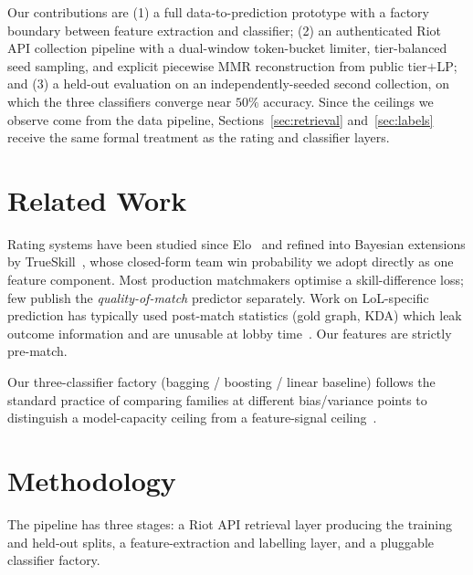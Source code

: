 \documentclass{article}
\begin{document}
Our contributions are (1) a full data-to-prediction prototype with a
factory boundary between feature extraction and classifier; (2) an
authenticated Riot API collection pipeline with a dual-window token-bucket
limiter, tier-balanced seed sampling, and explicit piecewise MMR
reconstruction from public tier$+$LP; and (3) a held-out evaluation on an
independently-seeded second collection, on which the three classifiers
converge near $50\%$ accuracy. Since the ceilings we observe come from
the data pipeline, Sections~\ref{sec:retrieval} and~\ref{sec:labels}
receive the same formal treatment as the rating and classifier layers.

\section{Related Work}

Rating systems have been studied since Elo~\citep{elo1978rating} and refined
into Bayesian extensions by TrueSkill~\citep{herbrich2006trueskill}, whose
closed-form team win probability we adopt directly as one feature component.
Most production matchmakers optimise a
skill-difference loss; few publish the \emph{quality-of-match} predictor
separately. Work on LoL-specific prediction has typically used post-match
statistics (gold graph, KDA) which leak outcome information and are unusable
at lobby time~\citep{do2021predicting}. Our features are strictly pre-match.

Our three-classifier factory (bagging / boosting / linear baseline) follows
the standard practice of comparing families at different bias/variance
points to distinguish a model-capacity ceiling from a feature-signal
ceiling~\citep{caruana2006empirical}.

\section{Methodology}

The pipeline has three stages: a Riot API retrieval layer producing the
training and held-out splits, a feature-extraction and labelling layer,
and a pluggable classifier factory.
\end{document}
